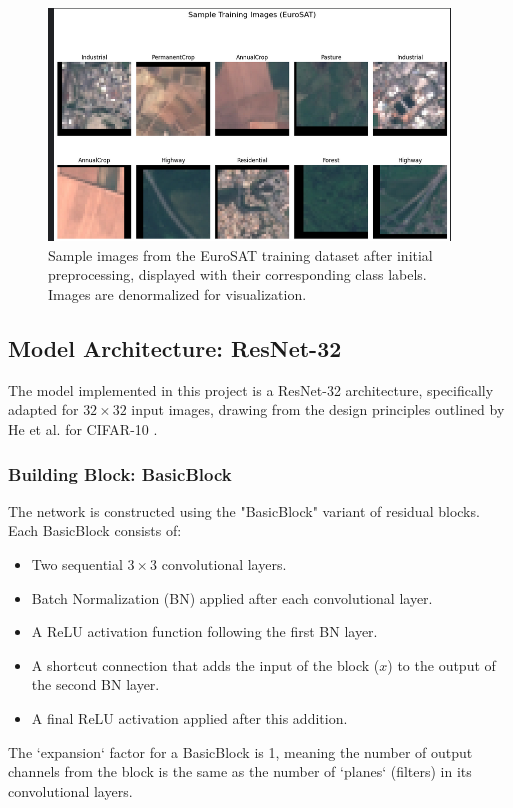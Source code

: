 \documentclass[11pt, a4paper]{article}
\begin{document}
\begin{figure}[H]
    \centering
    \includegraphics[width=0.95\textwidth]{sample_training_images.png}
    \caption{Sample images from the EuroSAT training dataset after initial preprocessing, displayed with their corresponding class labels. Images are denormalized for visualization.}
    \label{fig:eurosat_samples}
\end{figure}

\subsection{Model Architecture: ResNet-32}
The model implemented in this project is a ResNet-32 architecture, specifically adapted for $32 \times 32$ input images, drawing from the design principles outlined by He et al. for CIFAR-10 \cite{he2015deepresiduallearningimage}.

\subsubsection{Building Block: BasicBlock}
The network is constructed using the "BasicBlock" variant of residual blocks. Each BasicBlock consists of:
\begin{itemize}[itemsep=0.3em]
    \item Two sequential $3 \times 3$ convolutional layers.
    \item Batch Normalization (BN) applied after each convolutional layer.
    \item A ReLU activation function following the first BN layer.
    \item A shortcut connection that adds the input of the block ($x$) to the output of the second BN layer.
    \item A final ReLU activation applied after this addition.
\end{itemize}
The `expansion` factor for a BasicBlock is 1, meaning the number of output channels from the block is the same as the number of `planes` (filters) in its convolutional layers.
\end{document}
